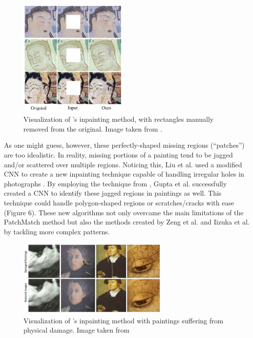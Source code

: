 \documentclass[a4paper,11pt]{article}
\begin{document}
\begin{figure}[h]
    \centering
    \includegraphics[width=0.48\textwidth]{inp.png}
    \caption{Visualization of \cite{zenggongzeng}'s inpainting method, with rectangles manually removed from the original. Image taken from \cite{zenggongzeng}.}
\end{figure}

As one might guess, however, these perfectly-shaped missing regions (“patches”) are too idealistic. In reality, missing portions of a painting tend to be jagged and/or scattered over multiple regions. Noticing this, Liu et al. used a modified CNN to create a new inpainting technique capable of handling irregular holes in photographs \cite{liu}. By employing the technique from \cite{liu}, Gupta et al. successfully created a CNN to identify these jagged regions \cite{gupta} in paintings as well. This technique could handle polygon-shaped regions or scratches/cracks with ease (Figure 6). These new algorithms not only overcame the main limitations of the PatchMatch method but also the methods created by Zeng et al. \cite{zenggongzeng} and Iizuka et al. \cite{iizuka} by tackling more complex patterns. 


\begin{figure}[h]
    \centering
    \includegraphics[width=0.67\textwidth]{irreginp.png}
    \caption{Visualization of \cite{gupta}'s inpainting method with paintings suffering from physical damage. Image taken from \cite{gupta}}
\end{figure}
\end{document}
